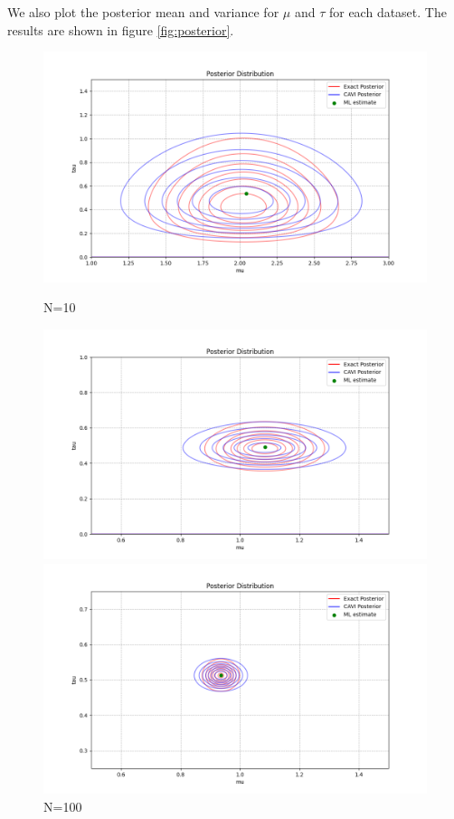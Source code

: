 \documentclass{article}
\begin{document}
\begin{multicols}{2}
    We also plot the posterior mean and variance for $\mu$ and $\tau$ for each dataset. The results are shown in figure \autoref{fig:posterior}. 

    \begin{figure}[H]
        \centering
        \begin{minipage}{0.49\textwidth}
            \centering
            \includegraphics[width=\textwidth]{figures/1.2/contour_d1.png}
            \caption{N=10}
        \end{minipage}
        \hfill
        \begin{minipage}{0.49\textwidth}
            \centering
            \includegraphics[width=\textwidth]{figures/1.2/contour_d2.png}
            \caption{N=100}
        \end{minipage}
        \hfill
        \begin{minipage}{0.49\textwidth}
            \centering
            \includegraphics[width=\textwidth]{figures/1.2/contour_d3.png}

\end{minipage}
\end{figure}
\end{multicols}
\end{document}
